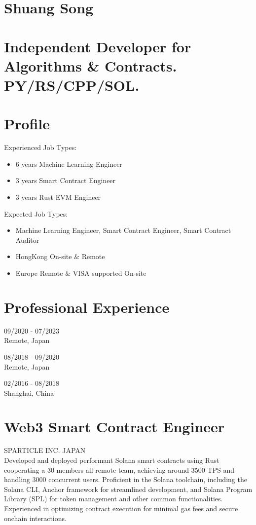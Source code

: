 \documentclass[10pt]{article}
\begin{document}
\section*{Shuang Song}
\section*{Independent Developer for Algorithms \& Contracts. PY/RS/CPP/SOL.}
\section*{Profile}
Experienced Job Types:

\begin{itemize}
  \item 6 years Machine Learning Engineer
  \item 3 years Smart Contract Engineer
  \item 3 years Rust EVM Engineer
\end{itemize}

Expected Job Types:

\begin{itemize}
  \item Machine Learning Engineer, Smart Contract Engineer, Smart Contract Auditor
  \item HongKong On-site \& Remote
  \item Europe Remote \& VISA supported On-site
\end{itemize}

\section*{Professional Experience}
09/2020 - 07/2023\\
Remote, Japan

08/2018 - 09/2020\\
Remote, Japan

02/2016 - 08/2018\\
Shanghai, China

\section*{Web3 Smart Contract Engineer}
SPARTICLE INC. JAPAN\\
Developed and deployed performant Solana smart contracts using Rust cooperating a 30 members all-remote team, achieving around 3500 TPS and handling 3000 concurrent users. Proficient in the Solana toolchain, including the Solana CLI, Anchor framework for streamlined development, and Solana Program Library (SPL) for token management and other common functionalities. Experienced in optimizing contract execution for minimal gas fees and secure onchain interactions.
\end{document}
